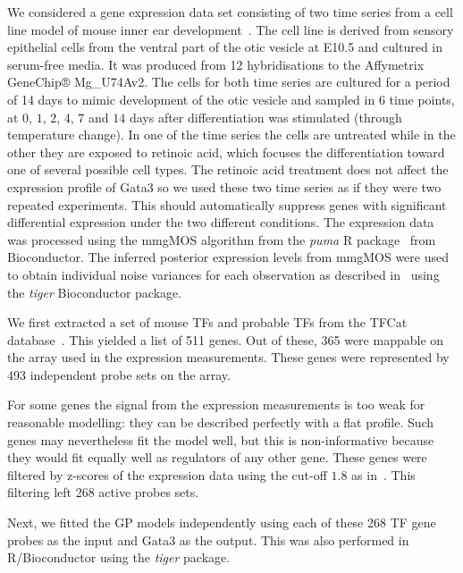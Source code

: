 \documentclass{article}
\begin{document}
We considered a gene expression data set consisting of two time series
from     a    cell     line     model    of     mouse    inner     ear
development~\cite{Helyer:model07}.   The cell line is derived from sensory epithelial cells from the ventral part of the otic vesicle at E10.5 and cultured in serum-free media. It was produced from 12 hybridisations to the Affymetrix GeneChip® Mg_U74Av2. The cells for both time series are cultured for a period of 14 days to mimic development of the otic vesicle and sampled in  $6$  time
points, at $0$,  $1$,  $2$, $4$,  $7$  and  $14$ days  after
differentiation  was stimulated  (through temperature  change).
In one of  the time series the cells are untreated  while in the other
they are  exposed to retinoic acid, which  focuses the differentiation
toward  one  of  several  possible  cell  types.   The  retinoic  acid
treatment does not affect the expression profile of Gata3 so we used these two
time series  as if  they were two  repeated experiments.   This should
automatically suppress genes  with significant differential expression
under the two different conditions.  The expression data was processed
using    the    mmgMOS    algorithm    from    the    \emph{puma}    R
package~\cite{Liu:tractable04,Pearson:puma09}  from Bioconductor.  The
inferred posterior  expression levels from mmgMOS were  used to obtain
individual   noise  variances  for   each  observation   as  described
in~\cite{Honkela:modelbased10}  using  the  \emph{tiger}  Bioconductor
package. %

We first extracted a set of  mouse TFs and probable TFs from the TFCat
database~\cite{Fulton2009}.  This yielded a list of 511 genes.  Out of
these,  365  were  mappable  on  the  array  used  in  the  expression
measurements.  These  genes were represented by  493 independent probe
sets on the array.

For some genes the signal from the expression measurements is too weak
for reasonable modelling: they can  be described perfectly with a flat
profile.  Such genes may nevertheless  fit the model well, but this is
non-informative because  they would fit equally well  as regulators of
any  other  gene.   These  genes  were filtered  by  z-scores  of  the
expression      data     using      the      cut-off     $1.8$      as
in~\cite{Honkela:modelbased10}.  This filtering left 268 active probes
sets.

Next, we fitted the GP models independently using each of these 268 TF
gene  probes as  the input  and Gata3  as the  output.  This  was also
performed in R/Bioconductor using the \emph{tiger} package.
\end{document}
